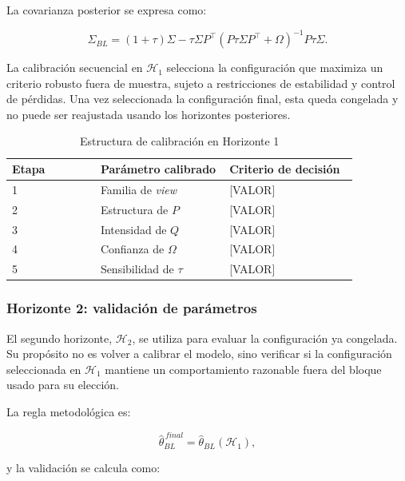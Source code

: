 \documentclass[11pt]{article}
\begin{document}
La covarianza posterior se expresa como:

\begin{equation}
    \Sigma_{BL}
    =
    (1+\tau)\Sigma
    -
    \tau \Sigma P^\top
    \left(
    P \tau \Sigma P^\top + \Omega
    \right)^{-1}
    P\tau\Sigma.
\end{equation}

La calibraci\'on secuencial en $\mathcal{H}_1$ selecciona la configuraci\'on que maximiza un criterio robusto fuera de muestra, sujeto a restricciones de estabilidad y control de p\'erdidas. Una vez seleccionada la configuraci\'on final, esta queda congelada y no puede ser reajustada usando los horizontes posteriores.

\begin{table}[H]
\centering
\caption{Estructura de calibraci\'on en Horizonte 1}
\begin{tabular}{p{0.22\linewidth} p{0.32\linewidth} p{0.32\linewidth}}
\toprule
Etapa & Par\'ametro calibrado & Criterio de decisi\'on \\
\midrule
1 & Familia de \textit{view} & [VALOR] \\
2 & Estructura de $P$ & [VALOR] \\
3 & Intensidad de $Q$ & [VALOR] \\
4 & Confianza de $\Omega$ & [VALOR] \\
5 & Sensibilidad de $\tau$ & [VALOR] \\
\bottomrule
\end{tabular}
\end{table}

\subsubsection{Horizonte 2: validaci\'on de par\'ametros}

El segundo horizonte, $\mathcal{H}_2$, se utiliza para evaluar la configuraci\'on ya congelada. Su prop\'osito no es volver a calibrar el modelo, sino verificar si la configuraci\'on seleccionada en $\mathcal{H}_1$ mantiene un comportamiento razonable fuera del bloque usado para su elecci\'on.

La regla metodol\'ogica es:

\begin{equation}
    \widehat{\theta}_{BL}^{\,final}
    =
    \widehat{\theta}_{BL}(\mathcal{H}_1),
\end{equation}

y la validaci\'on se calcula como:
\end{document}
